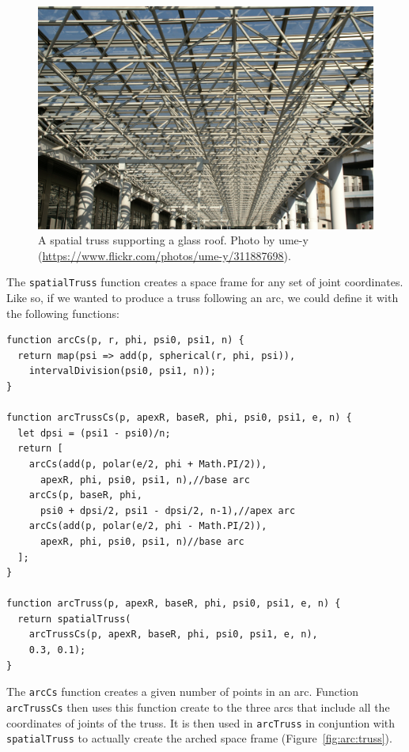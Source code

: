 \begin{figure}
  \centering
  \includegraphics[width=0.7\linewidth]{./images/space_frame_photo}
  \caption[A spatial truss supporting a glass roof.]{A spatial truss supporting a glass roof. Photo by ume-y (\url{https://www.flickr.com/photos/ume-y/311887698}).}
  \label{fig:spatial:truss}
\end{figure}

The {\tt spatialTruss} function creates a space frame for any set of joint coordinates.
Like so, if we wanted to produce a truss following an arc, we could define it with the following functions:

\begin{verbatim}
function arcCs(p, r, phi, psi0, psi1, n) {
  return map(psi => add(p, spherical(r, phi, psi)),
    intervalDivision(psi0, psi1, n));
}

function arcTrussCs(p, apexR, baseR, phi, psi0, psi1, e, n) {
  let dpsi = (psi1 - psi0)/n;
  return [
    arcCs(add(p, polar(e/2, phi + Math.PI/2)),
      apexR, phi, psi0, psi1, n),//base arc
    arcCs(p, baseR, phi,
      psi0 + dpsi/2, psi1 - dpsi/2, n-1),//apex arc
    arcCs(add(p, polar(e/2, phi - Math.PI/2)),
      apexR, phi, psi0, psi1, n)//base arc
  ];
}

function arcTruss(p, apexR, baseR, phi, psi0, psi1, e, n) {
  return spatialTruss(
    arcTrussCs(p, apexR, baseR, phi, psi0, psi1, e, n),
    0.3, 0.1);
}
\end{verbatim}

The {\tt arcCs} function creates a given number of points in an arc.
Function {\tt arcTrussCs} then uses this function create to the three arcs that include all the coordinates of joints of the truss.
It is then used in {\tt arcTruss} in conjuntion with {\tt spatialTruss} to actually create the arched space frame (Figure~\ref{fig:arc:truss}).

